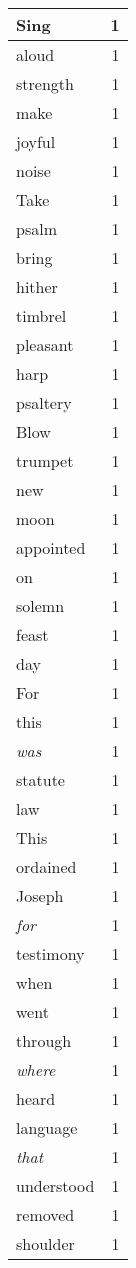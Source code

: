 \begin{center}
\begin{longtable}{l|r}
Sing & 1 \\ \hline
aloud & 1 \\ \hline
strength & 1 \\ \hline
make & 1 \\ \hline
joyful & 1 \\ \hline
noise & 1 \\ \hline
Take & 1 \\ \hline
psalm & 1 \\ \hline
bring & 1 \\ \hline
hither & 1 \\ \hline
timbrel & 1 \\ \hline
pleasant & 1 \\ \hline
harp & 1 \\ \hline
psaltery & 1 \\ \hline
Blow & 1 \\ \hline
trumpet & 1 \\ \hline
new & 1 \\ \hline
moon & 1 \\ \hline
appointed & 1 \\ \hline
on & 1 \\ \hline
solemn & 1 \\ \hline
feast & 1 \\ \hline
day & 1 \\ \hline
For & 1 \\ \hline
this & 1 \\ \hline
\emph{was} & 1 \\ \hline
statute & 1 \\ \hline
law & 1 \\ \hline
This & 1 \\ \hline
ordained & 1 \\ \hline
Joseph & 1 \\ \hline
\emph{for} & 1 \\ \hline
testimony & 1 \\ \hline
when & 1 \\ \hline
went & 1 \\ \hline
through & 1 \\ \hline
\emph{where} & 1 \\ \hline
heard & 1 \\ \hline
language & 1 \\ \hline
\emph{that} & 1 \\ \hline
understood & 1 \\ \hline
removed & 1 \\ \hline
shoulder & 1 \\ \hline

\end{longtable}
\end{center}
